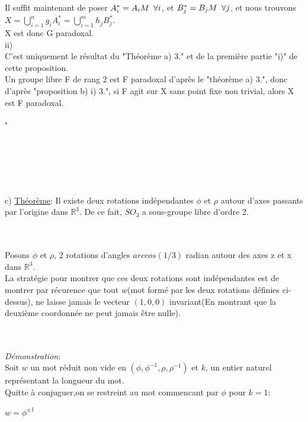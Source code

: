 \documentclass{article}
\begin{document}
Il suffit maintenant de poser $A_i^{*} = A_iM \hspace{0.18cm} \forall i$, et $B_j^{*}=B_jM \hspace{0.18cm} \forall j$, et nous trouvons $X =  \bigcup_{i=1}^ng_iA_i^{*} = \bigcup_{i=1}^mh_jB_j^{*}$.\\

X est donc G paradoxal.\\

ii)\\
C'est uniquement le résultat du "Théorème a) 3." et de la première partie "i)" de cette proposition.\\
Un groupe libre F de rang 2 est F paradoxal d'après le "théorème a) 3.", donc d'après "proposition b) i) 3.", si F agit sur X sans point fixe non trivial, alors X est F paradoxal.\\
\begin{flushright}
$\square$
\end{flushright}\\
\\~\\


\\~\\
c) \underline{Théorème}: Il existe deux rotations indépendantes $\phi$ et $\rho$ autour d'axes passants par l'origine dans $\mathbb{R}^3$. De ce fait, $SO_3$ a sous-groupe libre d'ordre 2.

\\~\\
Posons $\phi$ et $\rho$, 2 rotations d'angles $arccos(1/3)$ radian autour des axes z et x dans $\mathbb{R}^3$.\\
La stratégie pour montrer que ces deux rotations sont indépendantes est de montrer par récurence que tout $w$(mot formé par les deux rotations définies ci-dessus), ne laisse jamais le vecteur $(1,0,0)$ invariant(En montrant que la deuxième coordonnée ne peut jamais être nulle).

\\~\\
\textit{Démonstration}:\\
Soit $w$ un mot réduit non vide en $(\phi, \phi^{-1}, \rho, \rho^{-1})$ et $k$, un entier naturel représentant la longueur du mot.\\
Quitte à conjuguer,on se restreint au mot commencant par $\phi$ pour $k=1$:
\\
\begin{center}
$w=\phi^{\pm 1}$ \\
\end{center}
\end{document}
